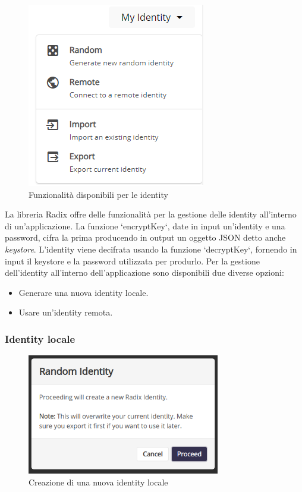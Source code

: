 \begin{figure}[H]
    \centering
    \includegraphics{images/application/identity-manage.png}
    \caption{Funzionalità disponibili per le identity}
    \label{fig:identity_manage}
\end{figure}

La libreria Radix offre delle funzionalità per la gestione delle identity all'interno di un'applicazione. La funzione `encryptKey`, date in input un'identity e una password, cifra la prima producendo in output un oggetto JSON detto anche \textit{keystore}. L'identity viene decifrata usando la funzione `decryptKey`, fornendo in input il keystore e la password utilizzata per produrlo. Per la gestione dell'identity all'interno dell'applicazione sono disponibili due diverse opzioni:
\begin{itemize}
    \item Generare una nuova identity locale.
    \item Usare un'identity remota.
\end{itemize}

\subsubsection{Identity locale}

\begin{figure}[H]
  \centering
  \includegraphics[width=0.75\textwidth]{images/application/create_random.png}
  \caption{Creazione di una nuova identity locale}
  \label{fig:identity_creation}
\end{figure}

